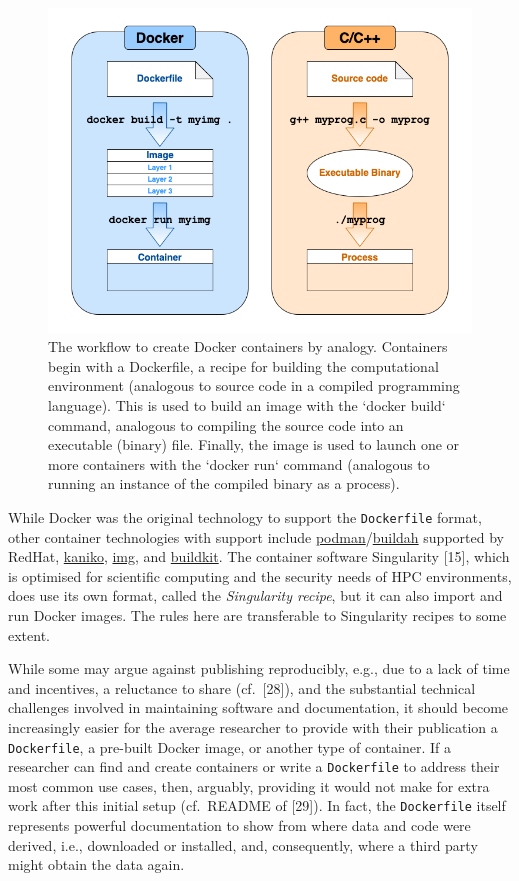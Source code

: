 \documentclass[10pt,letterpaper]{article}
\begin{document}
\begin{figure}[h]
\includegraphics[width=1\linewidth]{container-analogy} \caption{The workflow to create Docker containers by analogy. Containers begin with a Dockerfile, a recipe for building the computational environment (analogous to source code in a compiled programming language). This is used to build an image with the `docker build` command, analogous to compiling the source code into an executable (binary) file. Finally, the image is used to launch one or more containers with the `docker run` command (analogous to running an instance of the compiled binary as a process).}\label{fig:container-analogy}
\end{figure}

While Docker was the original technology to support the
\texttt{Dockerfile} format, other container technologies with support
include
\href{https://podman.io/}{podman}/\href{https://github.com/containers/buildah}{buildah}
supported by RedHat,
\href{https://github.com/GoogleContainerTools/kaniko}{kaniko},
\href{https://github.com/genuinetools/img}{img}, and
\href{https://github.com/moby/buildkit}{buildkit}. The container
software Singularity {[}15{]}, which is optimised for scientific
computing and the security needs of HPC environments, does use its own
format, called the \emph{Singularity recipe}, but it can also import and
run Docker images. The rules here are transferable to Singularity
recipes to some extent.

While some may argue against publishing reproducibly, e.g., due to a
lack of time and incentives, a reluctance to share (cf.~{[}28{]}), and
the substantial technical challenges involved in maintaining software
and documentation, it should become increasingly easier for the average
researcher to provide with their publication a \texttt{Dockerfile}, a
pre-built Docker image, or another type of container. If a researcher
can find and create containers or write a \texttt{Dockerfile} to address
their most common use cases, then, arguably, providing it would not make
for extra work after this initial setup (cf.~README of {[}29{]}). In
fact, the \texttt{Dockerfile} itself represents powerful documentation
to show from where data and code were derived, i.e., downloaded or
installed, and, consequently, where a third party might obtain the data
again.
\end{document}
